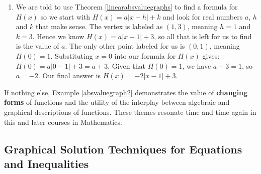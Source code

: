 \documentclass{ximera}
\begin{document}
\begin{example}
\begin{enumerate}
\begin{enumerate}
\begin{image}
\end{image}

	
The range of $g$ is $[-2,2]$ with a minimum of $-2$ achieved for all $t \geq 2$, and a maximum of $2$ for $t \leq 0$. We note that $g$ is constant on $(-\infty, 0]$ and $[2, \infty)$, but with different values, and $g$ is decreasing on $[0, 2]$. 

 
\end{enumerate}



\item We are told to use Theorem \ref{linearabsvaluegraphs} to find a formula for $H(x)$ so we start with $H(x) = a|x - h| + k$ and look for real numbers $a$, $h$ and $k$ that make sense.  The vertex is labeled as $(1, 3)$, meaning $h = 1$ and $k = 3$.  Hence we know $H(x) = a|x - 1| + 3$, so all that is left for us to find is the value of $a$.  The only other point labeled for us is $(0, 1)$, meaning $H(0) = 1$.  Substituting $x = 0$ into our formula for $H(x)$ gives:  $H(0) = a|0 - 1| + 3 = a + 3$.  Given that $H(0) = 1$, we have $a + 3 = 1$, so $a = -2$.  Our final answer is $H(x) = -2|x-1|+3$. 

\end{enumerate}

\end{example}

If nothing else, Example \ref{absvaluegraph2} demonstrates the value of \textbf{changing forms} of functions and the utility of the interplay between algebraic and graphical descriptions of functions.  These themes resonate time and time again in this and later courses in Mathematics.  

\subsection{Graphical Solution Techniques for Equations and Inequalities}
\label{EquationsInequalitiesGraphically}
\end{document}
